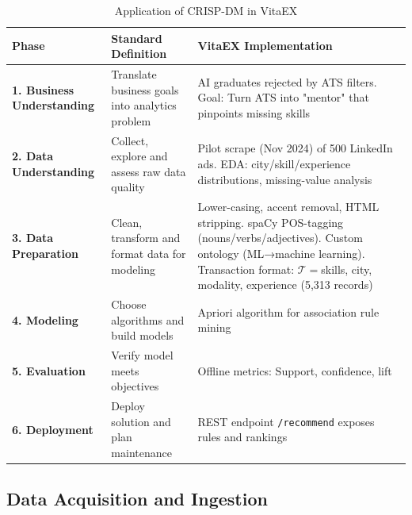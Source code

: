 \documentclass{svproc} %
\begin{document}
	
	
	
	
	\begin{table}[ht]
		\caption{Application of CRISP-DM in VitaEX}
		\label{tab:crispdm}
		\centering
		\small
		\begin{tabular}{p{30mm}p{35mm}p{58mm}}
			\toprule
			\textbf{Phase} & \textbf{Standard Definition} & \textbf{VitaEX Implementation} \\
			\midrule
			\textbf{1. Business Understanding} & 
			Translate business goals into analytics problem & 
			AI graduates rejected by ATS filters. Goal: Turn ATS into "mentor" that pinpoints missing skills \\
			\addlinespace
			
			\textbf{2. Data Understanding} & 
			Collect, explore and assess raw data quality & 
			Pilot scrape (Nov 2024) of 500 LinkedIn ads. EDA: city/skill/experience distributions, missing-value analysis \\
			\addlinespace
			
			\textbf{3. Data Preparation} & 
			Clean, transform and format data for modeling & 
			Lower-casing, accent removal, HTML stripping. spaCy POS-tagging (nouns/verbs/adjectives). Custom ontology (ML→machine learning). Transaction format: $\mathcal{T}=${skills, city, modality, experience} (5,313 records) \\
			\addlinespace
			
			\textbf{4. Modeling} & 
			Choose algorithms and build models & 
			Apriori algorithm for association rule mining \\
			\addlinespace
			
			\textbf{5. Evaluation} & 
			Verify model meets objectives & 
			Offline metrics: Support, confidence, lift \\
			\addlinespace
			
			\textbf{6. Deployment} & 
			Deploy solution and plan maintenance & 
			REST endpoint \texttt{/recommend} exposes rules and rankings \\
			\bottomrule
		\end{tabular}
	\end{table}
	
	\subsection{Data Acquisition and Ingestion}
	\label{ssec:data_acquisition}
	
\end{document}
